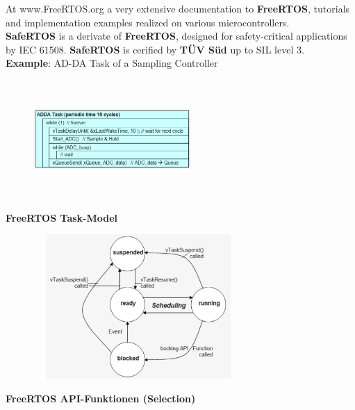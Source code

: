 At www.FreeRTOS.org a very extensive documentation to \textbf{FreeRTOS}, tutorials and implementation examples realized on various microcontrollers.\\

\textbf{SafeRTOS} is a derivate of \textbf{FreeRTOS}, designed for safety-critical applications  by IEC 61508. \textbf{SafeRTOS} is cerified by \textbf{T\"{U}V S\"{u}d} up to SIL level 3.\\

\textbf{Example}: AD-DA Task of a Sampling Controller\\

 	\begin{figure}[h]
    \centering
    \includegraphics[width=6cm, height=4.5cm]{Images/image131.png}
    \label{fig:Fig }
    \end{figure}
\newpage
{\rot\bf FreeRTOS Task-Model}

 	\begin{figure}[h]
    \centering
    \includegraphics[width=8cm, height=5.5cm]{Images/image132.png}
    \label{fig:Fig }
    \end{figure}

{\rot\bf FreeRTOS API-Funktionen (Selection)}\\

